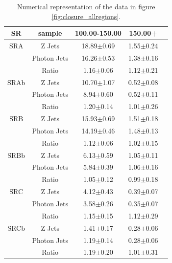       \begin{table}[!h]
        \begin{center}
          \caption{\label{tab:template_systematics} 
            Numerical representation of the data in figure \ref{fig:closure_allregions}.
          }
          \begin{tabular}{c|c|ccc}\hline
            SR & sample &100.00-150.00&150.00+\\
            \hline
            SRA & Z Jets  & 18.89$\pm$0.69 & 1.55$\pm$0.24\\
            & Photon Jets & 16.26$\pm$0.53 & 1.38$\pm$0.16\\
            & Ratio       & 1.16$\pm$0.06 & 1.12$\pm$0.21\\
            \hline

            SRAb & Z Jets & 10.70$\pm$1.07 & 0.52$\pm$0.08\\
            & Photon Jets & 8.94$\pm$0.60 & 0.52$\pm$0.11\\
            & Ratio       & 1.20$\pm$0.14 & 1.01$\pm$0.26\\
            \hline

            SRB & Z Jets  & 15.93$\pm$0.69 & 1.51$\pm$0.18\\
            & Photon Jets & 14.19$\pm$0.46 & 1.48$\pm$0.13\\
            & Ratio       & 1.12$\pm$0.06 & 1.02$\pm$0.15\\
            \hline

            SRBb & Z Jets & 6.13$\pm$0.59 & 1.05$\pm$0.11\\
            & Photon Jets & 5.84$\pm$0.39 & 1.06$\pm$0.16\\
            & Ratio       & 1.05$\pm$0.12 & 0.99$\pm$0.18\\
            \hline

            SRC & Z Jets  & 4.12$\pm$0.43 & 0.39$\pm$0.07\\
            & Photon Jets & 3.58$\pm$0.26 & 0.35$\pm$0.07\\
            & Ratio       & 1.15$\pm$0.15 & 1.12$\pm$0.29\\
            \hline

            SRCb & Z Jets & 1.41$\pm$0.17 & 0.28$\pm$0.06\\
            & Photon Jets & 1.19$\pm$0.14 & 0.28$\pm$0.06\\
            & Ratio       & 1.19$\pm$0.20 & 1.01$\pm$0.31\\
            \hline


\end{tabular}
\end{center}
\end{table}
